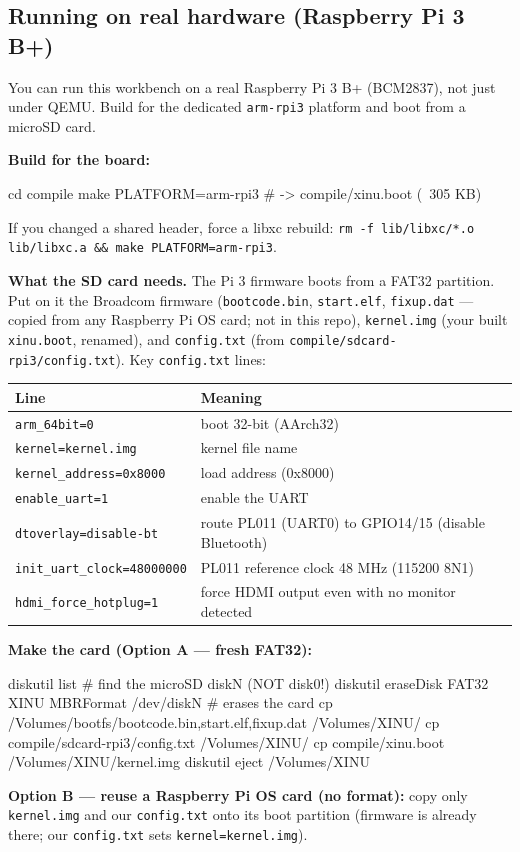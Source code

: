 \documentclass[a4paper,11pt]{article}
\begin{document}
\subsection{Running on real hardware (Raspberry Pi 3 B+)}
You can run this workbench on a real Raspberry Pi 3 B+ (BCM2837), not just under
QEMU. Build for the dedicated \verb|arm-rpi3| platform and boot from a microSD
card.

\textbf{Build for the board:}
\begin{code}
cd compile
make PLATFORM=arm-rpi3        # -> compile/xinu.boot (~305 KB)
\end{code}
If you changed a shared header, force a libxc rebuild:
\verb|rm -f lib/libxc/*.o lib/libxc.a && make PLATFORM=arm-rpi3|.

\textbf{What the SD card needs.} The Pi 3 firmware boots from a FAT32 partition.
Put on it the Broadcom firmware (\verb|bootcode.bin|, \verb|start.elf|,
\verb|fixup.dat| --- copied from any Raspberry Pi OS card; not in this repo),
\verb|kernel.img| (your built \verb|xinu.boot|, renamed), and \verb|config.txt|
(from \verb|compile/sdcard-rpi3/config.txt|). Key \verb|config.txt| lines:
\begin{center}\footnotesize
\begin{tabular}{@{}l p{8.2cm}@{}}
\toprule \textbf{Line} & \textbf{Meaning}\\ \midrule
\verb|arm_64bit=0|           & boot 32-bit (AArch32)\\
\verb|kernel=kernel.img|     & kernel file name\\
\verb|kernel_address=0x8000| & load address (0x8000)\\
\verb|enable_uart=1|         & enable the UART\\
\verb|dtoverlay=disable-bt|  & route PL011 (UART0) to GPIO14/15 (disable Bluetooth)\\
\verb|init_uart_clock=48000000| & PL011 reference clock 48 MHz (115200 8N1)\\
\verb|hdmi_force_hotplug=1|  & force HDMI output even with no monitor detected\\
\bottomrule
\end{tabular}
\end{center}

\textbf{Make the card (Option A --- fresh FAT32):}
\begin{code}
diskutil list                                        # find the microSD diskN (NOT disk0!)
diskutil eraseDisk FAT32 XINU MBRFormat /dev/diskN   # erases the card
cp /Volumes/bootfs/{bootcode.bin,start.elf,fixup.dat} /Volumes/XINU/
cp compile/sdcard-rpi3/config.txt /Volumes/XINU/
cp compile/xinu.boot /Volumes/XINU/kernel.img
diskutil eject /Volumes/XINU
\end{code}
\textbf{Option B --- reuse a Raspberry Pi OS card (no format):} copy only
\verb|kernel.img| and our \verb|config.txt| onto its boot partition (firmware is
already there; our \verb|config.txt| sets \verb|kernel=kernel.img|).
\end{document}
